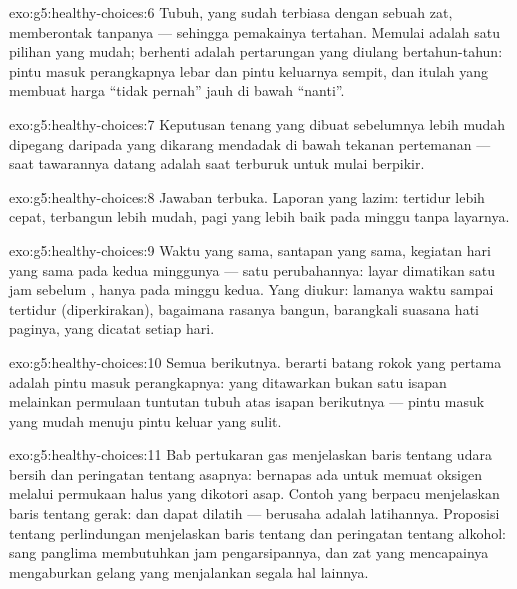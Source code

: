\begin{solution}{exo:g5:healthy-choices:6}
Tubuh, yang sudah terbiasa dengan sebuah zat, memberontak tanpanya ---
sehingga pemakainya tertahan. Memulai adalah satu pilihan yang mudah;
berhenti adalah pertarungan yang diulang bertahun-tahun: pintu masuk
perangkapnya lebar dan pintu keluarnya sempit, dan itulah yang membuat
harga ``tidak pernah'' jauh di bawah ``nanti''.
\end{solution}

\begin{solution}{exo:g5:healthy-choices:7}
Keputusan tenang yang dibuat sebelumnya lebih mudah dipegang daripada
yang dikarang mendadak di bawah tekanan pertemanan --- saat tawarannya
datang adalah saat terburuk untuk mulai berpikir.
\end{solution}

\begin{solution}{exo:g5:healthy-choices:8}
Jawaban terbuka. Laporan yang lazim: tertidur lebih cepat, terbangun
lebih mudah, pagi yang lebih baik pada minggu tanpa layarnya.
\end{solution}

\begin{solution}{exo:g5:healthy-choices:9}
Waktu  yang sama, santapan yang sama, kegiatan hari yang sama
pada kedua minggunya --- satu perubahannya: layar dimatikan satu jam
sebelum , hanya pada minggu kedua. Yang diukur: lamanya waktu
sampai tertidur (diperkirakan), bagaimana rasanya bangun, barangkali
suasana hati paginya, yang dicatat setiap hari.
\end{solution}

\begin{solution}{exo:g5:healthy-choices:10}
Semua  berikutnya.  berarti batang rokok yang pertama
adalah pintu masuk perangkapnya: yang ditawarkan bukan satu isapan
melainkan permulaan tuntutan tubuh atas isapan berikutnya --- pintu
masuk yang mudah menuju pintu keluar yang sulit.
\end{solution}

\begin{solution}{exo:g5:healthy-choices:11}
Bab pertukaran gas menjelaskan baris tentang udara bersih dan
peringatan tentang asapnya: bernapas ada untuk memuat oksigen melalui
permukaan halus yang dikotori asap. Contoh  yang berpacu
menjelaskan baris tentang gerak:  dan  dapat dilatih
--- berusaha adalah latihannya. Proposisi tentang perlindungan 
menjelaskan baris tentang  dan peringatan tentang alkohol: sang
panglima membutuhkan jam pengarsipannya, dan zat yang mencapainya
mengaburkan gelang yang menjalankan segala hal lainnya.
\end{solution}
